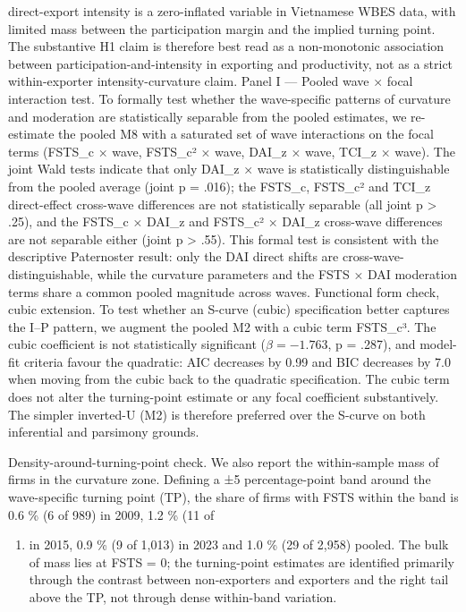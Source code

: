 \documentclass[12pt,a4paper]{article}
\providecommand{\tightlist}{\setlength{\itemsep}{0pt}\setlength{\parskip}{0pt}}
\begin{document}
direct-export intensity is a zero-inflated variable in Vietnamese WBES
data, with limited mass between the participation margin and the implied
turning point. The substantive H1 claim is therefore best read as a
non-monotonic association between participation-and-intensity in
exporting and productivity, not as a strict within-exporter
intensity-curvature claim. Panel I --- Pooled wave × focal interaction
test. To formally test whether the wave-specific patterns of curvature
and moderation are statistically separable from the pooled estimates, we
re-estimate the pooled M8 with a saturated set of wave interactions on
the focal terms (FSTS\_c × wave, FSTS\_c² × wave, DAI\_z × wave, TCI\_z
× wave). The joint Wald tests indicate that only DAI\_z × wave is
statistically distinguishable from the pooled average (joint p = .016);
the FSTS\_c, FSTS\_c² and TCI\_z direct-effect cross-wave differences
are not statistically separable (all joint p \textgreater{} .25), and
the FSTS\_c × DAI\_z and FSTS\_c² × DAI\_z cross-wave differences are
not separable either (joint p \textgreater{} .55). This formal test is
consistent with the descriptive Paternoster result: only the DAI direct
shifts are cross-wave-distinguishable, while the curvature parameters
and the FSTS × DAI moderation terms share a common pooled magnitude
across waves. Functional form check, cubic extension. To test whether an
S-curve (cubic) specification better captures the I--P pattern, we
augment the pooled M2 with a cubic term FSTS\_c³. The cubic coefficient
is not statistically significant (\(\beta = −1.763\), p = .287), and
model-fit criteria favour the quadratic: AIC decreases by 0.99 and BIC
decreases by 7.0 when moving from the cubic back to the quadratic
specification. The cubic term does not alter the turning-point estimate
or any focal coefficient substantively. The simpler inverted-U (M2) is
therefore preferred over the S-curve on both inferential and parsimony
grounds.

Density-around-turning-point check. We also report the within-sample
mass of firms in the curvature zone. Defining a ±5 percentage-point band
around the wave-specific turning point (TP), the share of firms with
FSTS within the band is 0.6 \% (6 of 989) in 2009, 1.2 \% (11 of

\begin{enumerate}
\def\labelenumi{\arabic{enumi})}
\setcounter{enumi}{955}
\tightlist
\item
  in 2015, 0.9 \% (9 of 1,013) in 2023 and 1.0 \% (29 of 2,958) pooled.
  The bulk of mass lies at FSTS = 0; the turning-point estimates are
  identified primarily through the contrast between non-exporters and
  exporters and the right tail above the TP, not through dense
  within-band variation.
\end{enumerate}
\end{document}
